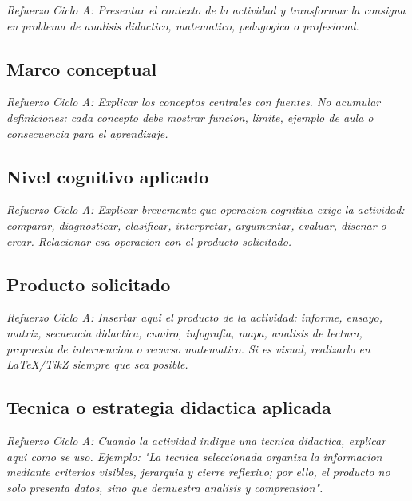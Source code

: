 \documentclass[
	spanish,
	letterpaper, oneside
]{article}
\begin{document}
\textit{Refuerzo Ciclo A: Presentar el contexto de la actividad y transformar la consigna en problema de analisis didactico, matematico, pedagogico o profesional.}

\subsection{Marco conceptual}

\textit{Refuerzo Ciclo A: Explicar los conceptos centrales con fuentes. No acumular definiciones: cada concepto debe mostrar funcion, limite, ejemplo de aula o consecuencia para el aprendizaje.}

\subsection{Nivel cognitivo aplicado}

\textit{Refuerzo Ciclo A: Explicar brevemente que operacion cognitiva exige la actividad: comparar, diagnosticar, clasificar, interpretar, argumentar, evaluar, disenar o crear. Relacionar esa operacion con el producto solicitado.}

\subsection{Producto solicitado}

\textit{Refuerzo Ciclo A: Insertar aqui el producto de la actividad: informe, ensayo, matriz, secuencia didactica, cuadro, infografia, mapa, analisis de lectura, propuesta de intervencion o recurso matematico. Si es visual, realizarlo en LaTeX/TikZ siempre que sea posible.}

\subsection{Tecnica o estrategia didactica aplicada}

\textit{Refuerzo Ciclo A: Cuando la actividad indique una tecnica didactica, explicar aqui como se uso. Ejemplo: "La tecnica seleccionada organiza la informacion mediante criterios visibles, jerarquia y cierre reflexivo; por ello, el producto no solo presenta datos, sino que demuestra analisis y comprension".}
\end{document}
